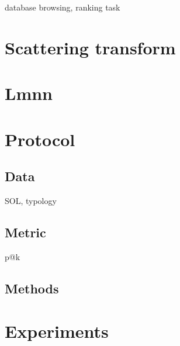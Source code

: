\documentclass{article}
\begin{document}
database browsing, ranking task



\section{Scattering transform}



\section{Lmnn}

\section{Protocol}

\subsection{Data}

SOL, typology

\subsection{Metric}

p@k

\subsection{Methods}


\section{Experiments}










\end{document}
